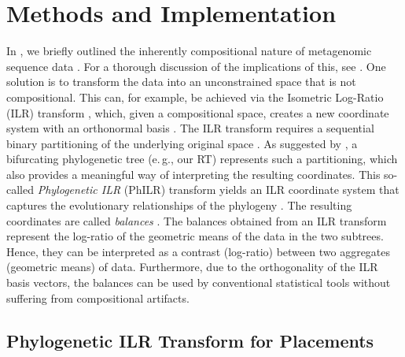 
\section{Methods and Implementation}
\label{ch:Balances:sec:Methods}

In , 
we briefly outlined the inherently compositional nature of metagenomic sequence data \cite{Gloor2017,Quinn2018}.
For a thorough discussion of the implications of this, see .
One solution is to transform the data into an unconstrained space that is not compositional.
This can, for example, be achieved via the Isometric Log-Ratio (ILR) transform \cite{Egozcue2003,Quinn2018},
which, given a compositional space, creates a new coordinate system with an orthonormal basis \cite{Egozcue2005}.
The ILR transform requires a sequential binary partitioning of the underlying original space \cite{Pawlowsky-Glahn2015}.
As suggested by ,
a bifurcating phylogenetic tree (e.\,g., our \ac{RT}) represents such a partitioning,
which also provides a meaningful way of interpreting the resulting coordinates.
This so-called \emph{Phylogenetic ILR} (PhILR) transform yields an ILR coordinate system
that captures the evolutionary relationships of the phylogeny \cite{Silverman2017}.
The resulting coordinates are called \emph{balances} \cite{Egozcue2003,Egozcue2005}.
The balances obtained from an ILR transform represent the log-ratio of the geometric means of the data in the two subtrees.
Hence, they can be interpreted as a contrast (log-ratio) between two aggregates (geometric means) of data.
Furthermore, due to the orthogonality of the ILR basis vectors,
the balances can be used by conventional statistical tools without suffering from compositional artifacts.


\subsection{Phylogenetic ILR Transform for Placements}
\label{ch:Balances:sec:Methods:sub:ILRTransform}

